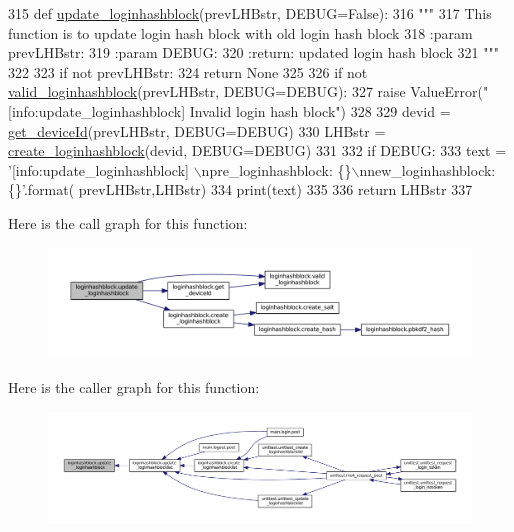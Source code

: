 \begin{DoxyCode}
315 \textcolor{keyword}{def }\hyperlink{namespaceloginhashblock_afef75d97c834ce0fda711b93d0b56b00}{update\_loginhashblock}(prevLHBstr, DEBUG=False):
316     \textcolor{stringliteral}{"""}
317 \textcolor{stringliteral}{    This function is to update login hash block with old login hash block}
318 \textcolor{stringliteral}{    :param prevLHBstr:}
319 \textcolor{stringliteral}{    :param DEBUG:}
320 \textcolor{stringliteral}{    :return: updated login hash block}
321 \textcolor{stringliteral}{    """}
322 
323     \textcolor{keywordflow}{if} \textcolor{keywordflow}{not} prevLHBstr:
324         \textcolor{keywordflow}{return} \textcolor{keywordtype}{None}
325 
326     \textcolor{keywordflow}{if} \textcolor{keywordflow}{not} \hyperlink{namespaceloginhashblock_adb424539d851426da7b65d53c5a6d577}{valid\_loginhashblock}(prevLHBstr, DEBUG=DEBUG):
327         \textcolor{keywordflow}{raise} ValueError(\textcolor{stringliteral}{"[info:update\_loginhashblock] Invalid login hash block"})
328 
329     devid = \hyperlink{namespaceloginhashblock_a17417f2f6bca76ab51170082a562e5f6}{get\_deviceId}(prevLHBstr, DEBUG=DEBUG)
330     LHBstr = \hyperlink{namespaceloginhashblock_ad3ef8dab740c69ca8424797f9c146a53}{create\_loginhashblock}(devid, DEBUG=DEBUG)
331 
332     \textcolor{keywordflow}{if} DEBUG:
333         text = \textcolor{stringliteral}{'[info:update\_loginhashblock] \(\backslash\)npre\_loginhashblock: \{\}\(\backslash\)nnew\_loginhashblock: \{\}'}.format(
      prevLHBstr,LHBstr)
334         print(text)
335 
336     \textcolor{keywordflow}{return} LHBstr
337 
\end{DoxyCode}


Here is the call graph for this function\+:\nopagebreak
\begin{figure}[H]
\begin{center}
\leavevmode
\includegraphics[width=350pt]{namespaceloginhashblock_afef75d97c834ce0fda711b93d0b56b00_cgraph}
\end{center}
\end{figure}




Here is the caller graph for this function\+:\nopagebreak
\begin{figure}[H]
\begin{center}
\leavevmode
\includegraphics[width=350pt]{namespaceloginhashblock_afef75d97c834ce0fda711b93d0b56b00_icgraph}
\end{center}
\end{figure}


